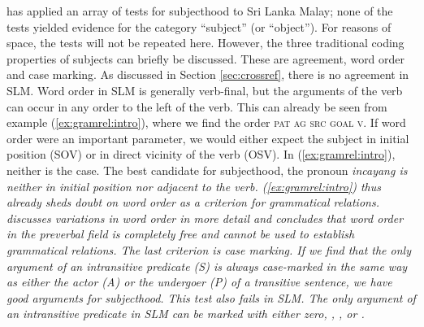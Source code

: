 \documentclass[a4paper]{article}
\begin{document}
\citet{Nordhoff2009phd} has applied an array of tests for subjecthood to Sri Lanka Malay; none of the tests yielded evidence for the category ``subject'' (or ``object''). For reasons of space, the tests will not be repeated here.  However, the three traditional coding properties of subjects can briefly be discussed. These are agreement, word order and case marking. As discussed in Section \ref{sec:crossref}, there is no agreement in SLM. Word order in SLM is generally verb-final, but the arguments of the verb can occur in any order to the left of the verb. This can already be seen from example (\ref{ex:gramrel:intro}), where we find the order \textsc{pat ag src goal v}. If word order were an important parameter, we would either expect the subject in initial position (SOV) or in direct vicinity of the verb (OSV). In (\ref{ex:gramrel:intro}), neither is the case. The best candidate for subjecthood, the pronoun \em incayang \em is neither in initial position nor adjacent to the verb. (\ref{ex:gramrel:intro}) thus already sheds doubt on word order as a criterion for grammatical relations.  \citet{Nordhoff2009phd} discusses variations in word order in more detail and concludes that word order in the preverbal field is completely free and cannot be used to establish grammatical relations. The last criterion is case marking. If we find that the only argument of an intransitive predicate (S) is always case-marked in the same way as either the actor (A) or the undergoer (P) of a transitive sentence, we have good arguments for subjecthood. This test also fails in SLM.  The only argument of an intransitive predicate in SLM can be marked with either zero, , , or .

 

\end{document}
